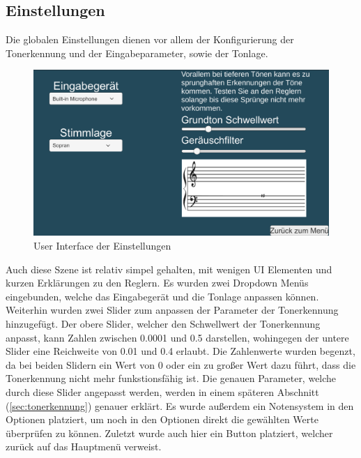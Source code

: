 \newpage

\subsection*{Einstellungen}
Die globalen Einstellungen dienen vor allem der Konfigurierung der Tonerkennung und der Eingabeparameter, sowie der Tonlage. 
\begin{figure}[H]
    \centering
    \includegraphics[width=1\textwidth]{Bilder/optionen.png}
    \caption{User Interface der Einstellungen}
    \label{sec:hps_algo}
\end{figure}
Auch diese Szene ist relativ simpel gehalten, mit wenigen UI Elementen und kurzen Erklärungen zu den Reglern. Es wurden zwei Dropdown Menüs eingebunden, welche das Eingabegerät und die Tonlage anpassen können. Weiterhin wurden zwei Slider zum anpassen der Parameter der Tonerkennung hinzugefügt. Der obere Slider, welcher den Schwellwert der Tonerkennung anpasst, kann Zahlen zwischen 0.0001 und 0.5 darstellen, wohingegen der untere Slider eine Reichweite von 0.01 und 0.4 erlaubt. Die Zahlenwerte wurden begenzt, da bei beiden Slidern ein Wert von 0 oder ein zu großer Wert dazu führt, dass die Tonerkennung nicht mehr funkstionsfähig ist. Die genauen Parameter, welche durch diese Slider angepasst werden, werden in einem späteren Abschnitt (\ref{sec:tonerkennung}) genauer erklärt. Es wurde außerdem ein Notensystem in den Optionen platziert, um noch in den Optionen direkt die gewählten Werte überprüfen zu können. Zuletzt wurde auch hier ein Button platziert, welcher zurück auf das Hauptmenü verweist. 

\newpage

